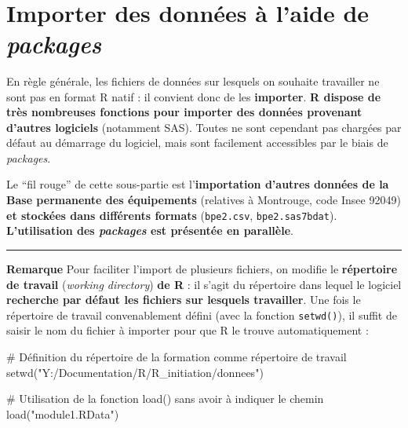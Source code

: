 \documentclass[12pt,twosided, notitlepage]{book}
\newenvironment{Shaded}{}{}
\newcommand{\KeywordTok}[1]{\textcolor[rgb]{0.00,0.00,1.00}{#1}}
\newcommand{\StringTok}[1]{\textcolor[rgb]{0.00,0.50,0.50}{#1}}
\newcommand{\CommentTok}[1]{\textcolor[rgb]{0.00,0.50,0.00}{#1}}
\newcommand{\NormalTok}[1]{#1}
\renewenvironment{Shaded}{\begin{snugshade}}{\end{snugshade}}
\begin{document}
~

\section{\texorpdfstring{Importer des données à l'aide de
\emph{packages}}{Importer des données à l'aide de packages}}\label{importer-des-donnees-a-laide-de-packages}

En règle générale, les fichiers de données sur lesquels on souhaite
travailler ne sont pas en format R natif : il convient donc de les
\textbf{importer}. \textbf{R dispose de très nombreuses fonctions pour
importer des données provenant d'autres logiciels} (notamment SAS).
Toutes ne sont cependant pas chargées par défaut au démarrage du
logiciel, mais sont facilement accessibles par le biais de
\emph{packages}.

Le \enquote{fil rouge} de cette sous-partie est l'\textbf{importation
d'autres données de la Base permanente des équipements} (relatives à
Montrouge, code Insee 92049) \textbf{et stockées dans différents
formats} (\texttt{bpe2.csv}, \texttt{bpe2.sas7bdat}).
\textbf{L'utilisation des \emph{packages} est présentée en parallèle}.

\begin{center}\rule{0.5\linewidth}{\linethickness}\end{center}

\textbf{Remarque} Pour faciliter l'import de plusieurs fichiers, on
modifie le \textbf{répertoire de travail} (\emph{working directory})
\textbf{de R} : il s'agit du répertoire dans lequel le logiciel
\textbf{recherche par défaut les fichiers sur lesquels travailler}. Une
fois le répertoire de travail convenablement défini (avec la fonction
\texttt{setwd()}), il suffit de saisir le
nom du fichier à importer pour que R le trouve automatiquement
:

\begin{Shaded}
\begin{Highlighting}[]
\CommentTok{# Définition du répertoire de la formation comme répertoire de travail}
\KeywordTok{setwd}\NormalTok{(}\StringTok{"Y:/Documentation/R/R_initiation/donnees"}\NormalTok{)}

\CommentTok{# Utilisation de la fonction load() sans avoir à indiquer le chemin}
\KeywordTok{load}\NormalTok{(}\StringTok{"module1.RData"}\NormalTok{)}
\end{Highlighting}
\end{Shaded}
\end{document}
